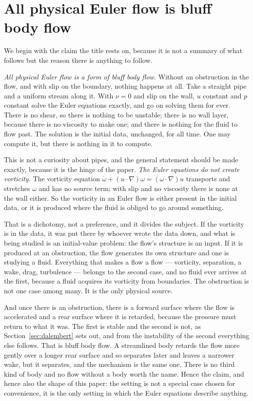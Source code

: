 \documentclass[11pt]{article}
\newcommand{\grad}{\nabla}
\begin{document}
\section{All physical Euler flow is bluff body flow}\label{sec:setting}

We begin with the claim the title rests on, because it is not a summary of what follows but the
reason there is anything to follow.

\emph{All physical Euler flow is a form of bluff body flow.} Without an obstruction in the flow, and
with slip on the boundary, nothing happens at all. Take a straight pipe and a uniform stream along
it. With $\nu=0$ and slip on the wall, $u$ constant and $p$ constant solve the Euler equations exactly,
and go on solving them for ever. There is no shear, so there is nothing to be unstable; there is no
wall layer, because there is no viscosity to make one; and there is nothing for the fluid to flow
past. The solution is the initial data, unchanged, for all time. One may compute it, but there is
nothing in it to compute.

This is not a curiosity about pipes, and the general statement should be made exactly, because it is
the hinge of the paper. \emph{The Euler equations do not create vorticity.} The vorticity equation
$\dot\omega + (u\cdot\grad)\omega = (\omega\cdot\grad)u$ transports and stretches $\omega$ and has no
source term; with slip and no viscosity there is none at the wall either. So the vorticity in an
Euler flow is either present in the initial data, or it is produced where the fluid is obliged to go
around something.

That is a dichotomy, not a preference, and it divides the subject. If the vorticity is in the data,
it was put there by whoever wrote the data down, and what is being studied is an initial-value
problem: the flow's structure is an input. If it is produced at an obstruction, the flow generates
its own structure and one is studying a fluid. Everything that makes a flow a flow --- vorticity,
separation, a wake, drag, turbulence --- belongs to the second case, and no fluid ever arrives at the
first, because a fluid acquires its vorticity from boundaries. The obstruction is not one case among
many. It is the only physical source.

And once there is an obstruction, there is a forward surface where the flow is accelerated and a
rear surface where it is retarded, because the pressure must return to what it was. The first is
stable and the second is not, as Section~\ref{sec:dalembert} sets out, and from the instability of
the second everything else follows. That is bluff body flow. A streamlined body retards the flow more
gently over a longer rear surface and so separates later and leaves a narrower wake, but it
separates, and the mechanism is the same one. There is no third kind of body and no flow without a
body worth the name. Hence the claim, and hence also the shape of this paper: the setting is not a
special case chosen for convenience, it is the only setting in which the Euler equations describe
anything.
\end{document}
